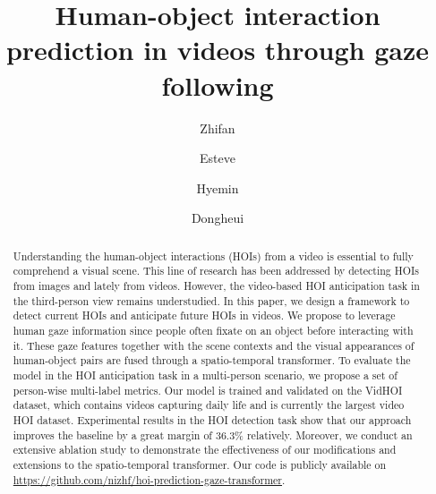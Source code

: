 \documentclass[times,twocolumn,final,authoryear]{elsarticle}
\begin{document}
\ifpreprint
  \setcounter{page}{1}
\else
  \setcounter{page}{1}
\fi

\begin{frontmatter}

\title{Human-object interaction prediction in videos through gaze following}

\author[1]{Zhifan }
\author[2]{Esteve }
\author[3]{Hyemin }
\author[2,4]{Dongheui }


\address[1]{Technical University of Munich (TUM), Arcisstr. 21, Munich 80333, Germany}
\address[2]{Technische Universität Wien (TU Wien), Karlsplatz 13, Vienna 1040, Austria}
\address[3]{Ulsan National Institute of Science and Technology (UNIST), UNIST-gil 50, Ulsan 44919, Republic of Korea}
\address[4]{German Aerospace Center (DLR), Muenchener Str. 20, Wessling 82234, Germany}

\begin{abstract}
    Understanding the human-object interactions (HOIs) from a video is essential to fully comprehend a visual scene. This line of research has been addressed by detecting HOIs from images and lately from videos. However, the video-based HOI anticipation task in the third-person view remains understudied. In this paper, we design a framework to detect current HOIs and anticipate future HOIs in videos. We propose to leverage human gaze information since people often fixate on an object before interacting with it. These gaze features together with the scene contexts and the visual appearances of human-object pairs are fused through a spatio-temporal transformer. To evaluate the model in the HOI anticipation task in a multi-person scenario, we propose a set of person-wise multi-label metrics. Our model is trained and validated on the VidHOI dataset, which contains videos capturing daily life and is currently the largest video HOI dataset. Experimental results in the HOI detection task show that our approach improves the baseline by a great margin of 36.3\% relatively. Moreover, we conduct an extensive ablation study to demonstrate the effectiveness of our modifications and extensions to the spatio-temporal transformer. Our code is publicly available on \url{https://github.com/nizhf/hoi-prediction-gaze-transformer}.
\end{abstract}

\end{frontmatter}
\end{document}
